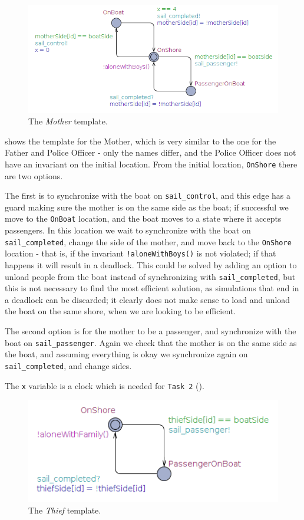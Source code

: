 \begin{figure}[H] \centering
	\includegraphics[width=1\textwidth]{Images/mom.png}
	\caption{The \textit{Mother} template.}\label{fig:mother}
\end{figure} 

\noindent {} shows the template for the Mother, which is very similar to the one for the Father and Police Officer - only the names differ, and the Police Officer does not have an invariant on the initial location. From the initial location, \texttt{OnShore} there are two options.

The first is to synchronize with the boat on \texttt{sail_control}, and this edge has a guard making sure the mother is on the same side as the boat; if successful we move to the \texttt{OnBoat} location, and the boat moves to a state where it accepts passengers. In this location we wait to synchronize with the boat on \texttt{sail_completed}, change the side of the mother, and move back to the \texttt{OnShore} location - that is, if the invariant \texttt{!aloneWithBoys()} is not violated; if that happens it will result in a deadlock. This could be solved by adding an option to unload people from the boat instead of synchronizing with \texttt{sail_completed}, but this is not necessary to find the most efficient solution, as simulations that end in a deadlock can be discarded; it clearly does not make sense to load and unload the boat on the same shore, when we are looking to be efficient. 

The second option is for the mother to be a passenger, and synchronize with the boat on \texttt{sail_passenger}. Again we check that the mother is on the same side as the boat, and assuming everything is okay we synchronize again on \texttt{sail_completed}, and change sides.

The \texttt{x} variable is a clock which is needed for \texttt{Task 2} ().

\begin{figure}[H] \centering
	\includegraphics[width=1\textwidth]{Images/thief.png}
	\caption{The \textit{Thief} template.}\label{fig:thief}
\end{figure} 

